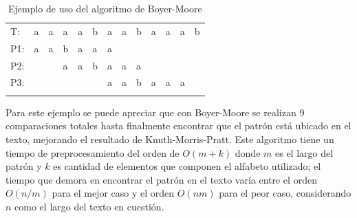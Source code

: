 \begin{table}[h]
\centering
\label{my-label7}
\begin{tabular}{lllllllllllll}
\cline{2-13}
\multicolumn{1}{l|}{T:}  & \multicolumn{1}{l|}{a}                         & \multicolumn{1}{l|}{a}                         & \multicolumn{1}{l|}{a}                         & \multicolumn{1}{l|}{a}                         & \multicolumn{1}{l|}{b}                         & \multicolumn{1}{l|}{a}                         & \multicolumn{1}{l|}{a}                         & \multicolumn{1}{l|}{b}                         & \multicolumn{1}{l|}{a}                         & \multicolumn{1}{l|}{a}                         & \multicolumn{1}{l|}{a}                         & \multicolumn{1}{l|}{b} \\ \cline{2-13} 
\multicolumn{1}{l}{P1:} & \multicolumn{1}{l}{a} & \multicolumn{1}{l}{a} & \multicolumn{1}{l}{b} & \multicolumn{1}{l}{a} & \multicolumn{1}{l}{\cellcolor[HTML]{FD6864}a} & \multicolumn{1}{l}{\cellcolor[HTML]{9AFF99}a} &                    &       &                       &        &                       &                        \\
P2:                      &                       &  & \multicolumn{1}{l}{a} & \multicolumn{1}{l}{a} & \multicolumn{1}{l}{b} & \multicolumn{1}{l}{a} & \multicolumn{1}{l}{a} & \multicolumn{1}{l}{\cellcolor[HTML]{FD6864}a} &              &               &                     &                        \\
P3:                      &                       &                       &                        &                      &  & \multicolumn{1}{l}{\cellcolor[HTML]{9AFF99}a} & \multicolumn{1}{l}{\cellcolor[HTML]{9AFF99}a} & \multicolumn{1}{l}{\cellcolor[HTML]{9AFF99}b} & \multicolumn{1}{l}{\cellcolor[HTML]{9AFF99}a} & \multicolumn{1}{l}{\cellcolor[HTML]{9AFF99}a} & \multicolumn{1}{l}{\cellcolor[HTML]{9AFF99}a} &                        \\
                         &                      &                      &                      &                       &  &                       &                       &  &                        &  &        &                        \\  
\end{tabular}
\caption{Ejemplo de uso del algoritmo de Boyer-Moore}
\end{table}

Para este ejemplo se puede apreciar que con Boyer-Moore se realizan 9 comparaciones totales hasta finalmente encontrar que el patrón está ubicado en el texto, mejorando el resultado de Knuth-Morris-Pratt.
Este algoritmo tiene un tiempo de preprocesamiento del orden de $O(m+k)$ donde $m$ es el largo del patrón y $k$ es cantidad de elementos que componen el alfabeto utilizado; el tiempo que demora en encontrar el patrón en el texto varía entre el orden $O(n/m)$ para el mejor caso y el orden $O(nm)$ para el peor caso, considerando $n$ como el largo del texto en cuestión.

